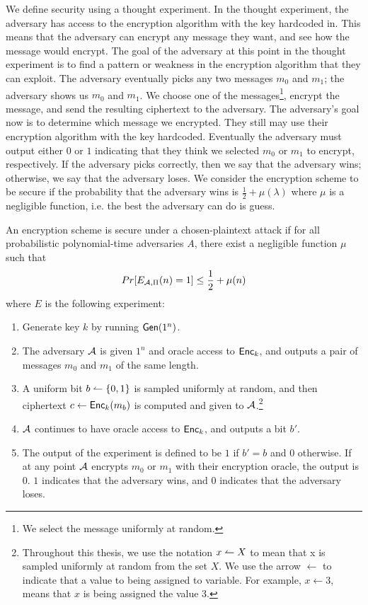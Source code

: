 We define security using a thought experiment. 
In the thought experiment, the adversary has access to the encryption algorithm with the key hardcoded in. 
This means that the adversary can encrypt any message they want, and see how the message would encrypt. 
The goal of the adversary at this point in the thought experiment is to find a pattern or weakness in the encryption algorithm that they can exploit.
The adversary eventually picks any two messages $m_0$ and $m_1$; the adversary shows us $m_0$ and $m_1$.
We choose one of the messages\footnote{We select the message uniformly at random.}, encrypt the message, and send the resulting ciphertext to the adversary.
The adversary's goal now is to determine which message we encrypted.
They still may use their encryption algorithm with the key hardcoded.
Eventually the adversary must output either $0$ or $1$ indicating that they think we selected $m_0$ or $m_1$ to encrypt, respectively.
If the adversary picks correctly, then we say that the adversary wins; otherwise, we say that the adversary loses.
We consider the encryption scheme to be secure if the probability that the adversary wins is $\frac{1}{2} + \mu(\lambda)$ where $\mu$ is a negligible function, i.e. the best the adversary can do is guess.

\begin{definition}
An encryption scheme is secure under a chosen-plaintext attack if for all probabilistic polynomial-time adversaries $A$, there exist a negligible function $\mu$ such that
\begin{equation}
Pr[E_{\mathcal{A}, \Pi}(n) = 1] \leq \frac{1}{2} + \mu(n)
\end{equation}
where $E$ is the following experiment:
\begin{enumerate}
\item Generate key $k$ by running $\textsf{Gen}(1^n)$. 
\item The adversary $\mathcal{A}$ is given $1^n$ and oracle access to $\textsf{Enc}_k$, and outputs a pair of messages $m_0$ and $m_1$ of the same length.
\item A uniform bit $b \leftharpoonup \{0,1\}$ is sampled uniformly at random, and then ciphertext $c \gets \textsf{Enc}_k(m_b)$ is computed and given to $\mathcal{A}$.\footnote{Throughout this thesis, we use the notation $x \leftharpoonup X$ to mean that x is sampled uniformly at random from the set $X$. We use the arrow $\gets$ to indicate that a value to being assigned to variable. For example, $x \gets 3$, means that $x$ is being assigned the value $3$.}
\item $\mathcal{A}$ continues to have oracle access to $\textsf{Enc}_k$, and outputs a bit $b'$. 
\item The output of the experiment is defined to be $1$ if $b' = b$ and $0$ otherwise. If at any point $\mathcal{A}$ encrypts $m_0$ or $m_1$ with their encryption oracle, the output is $0$. $1$ indicates that the adversary wins, and $0$ indicates that the adversary loses.
\end{enumerate}
\end{definition}

